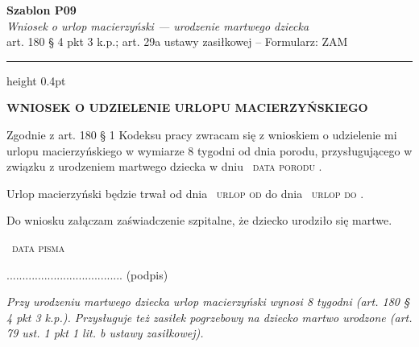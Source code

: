 \documentclass[11pt,a4paper]{article}
\newcommand{\Pole}[1]{%
  \textcolor{szary}{\dotfill}\,%
  {\scriptsize\textcolor{szary}{\textsc{#1}}}%
}
\newcommand{\NaglowekPisma}[1]{%
  \par\vspace{0.8em}%
  \begin{center}%
    {\large\bfseries\MakeUppercase{#1}}%
  \end{center}%
  \vspace{0.4em}%
}
\begin{document}
\begin{flushright}
{\footnotesize\color{szary}
\textbf{Szablon P09}\\
{\itshape Wniosek o urlop macierzyński --- urodzenie martwego dziecka}\\
art. 180 \S{} 4 pkt 3 k.p.; art. 29a ustawy zasiłkowej -- Formularz: ZAM}\
\end{flushright}

\vspace{0.5em}
{\color{ramka}\hrule height 0.4pt}
\vspace{0.8em}

\NaglowekPisma{WNIOSEK O UDZIELENIE URLOPU MACIERZYŃSKIEGO}

Zgodnie z art. 180 \S{} 1 Kodeksu pracy zwracam się z wnioskiem o udzielenie mi
urlopu macierzyńskiego w wymiarze 8 tygodni od dnia porodu, przysługującego
w związku z urodzeniem martwego dziecka w dniu \Pole{data porodu}.

Urlop macierzyński będzie trwał od dnia \Pole{urlop od} do dnia \Pole{urlop do}.

Do wniosku załączam zaświadczenie szpitalne, że dziecko urodziło się martwe.

\Pole{data pisma}
.....................................
(podpis)

\vfill
{\footnotesize\textcolor{szary}\itshape Przy urodzeniu martwego dziecka urlop macierzyński wynosi 8 tygodni (art. 180 \S{} 4 pkt 3 k.p.). Przysługuje też zasiłek pogrzebowy na dziecko martwo urodzone (art. 79 ust. 1 pkt 1 lit. b ustawy zasiłkowej). }
\end{document}
